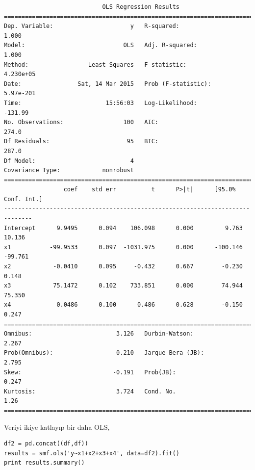 \documentclass[12pt,fleqn]{article}\usepackage{../../common}
\begin{document}
\begin{verbatim}
                            OLS Regression Results                            
==============================================================================
Dep. Variable:                      y   R-squared:                       1.000
Model:                            OLS   Adj. R-squared:                  1.000
Method:                 Least Squares   F-statistic:                 4.230e+05
Date:                Sat, 14 Mar 2015   Prob (F-statistic):          5.97e-201
Time:                        15:56:03   Log-Likelihood:                -131.99
No. Observations:                 100   AIC:                             274.0
Df Residuals:                      95   BIC:                             287.0
Df Model:                           4                                         
Covariance Type:            nonrobust                                         
==============================================================================
                 coef    std err          t      P>|t|      [95.0% Conf. Int.]
------------------------------------------------------------------------------
Intercept      9.9495      0.094    106.098      0.000         9.763    10.136
x1           -99.9533      0.097  -1031.975      0.000      -100.146   -99.761
x2            -0.0410      0.095     -0.432      0.667        -0.230     0.148
x3            75.1472      0.102    733.851      0.000        74.944    75.350
x4             0.0486      0.100      0.486      0.628        -0.150     0.247
==============================================================================
Omnibus:                        3.126   Durbin-Watson:                   2.267
Prob(Omnibus):                  0.210   Jarque-Bera (JB):                2.795
Skew:                          -0.191   Prob(JB):                        0.247
Kurtosis:                       3.724   Cond. No.                         1.26
==============================================================================
\end{verbatim}

Veriyi ikiye katlayıp bir daha OLS,

\begin{verbatim}
df2 = pd.concat((df,df))
results = smf.ols('y~x1+x2+x3+x4', data=df2).fit()
print results.summary()
\end{verbatim}
\end{document}
